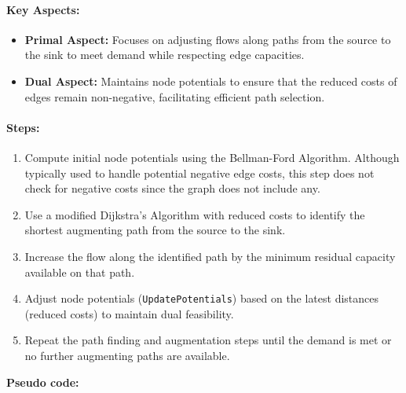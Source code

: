 \documentclass{article}
\begin{document}
\paragraph{Key Aspects:}
\begin{itemize}
    \item \textbf{Primal Aspect:} Focuses on adjusting flows along paths from the source to the sink to meet demand while respecting edge capacities.
    \item \textbf{Dual Aspect:} Maintains node potentials to ensure that the reduced costs of edges remain non-negative, facilitating efficient path selection.
\end{itemize}

\paragraph{Steps:}
\begin{enumerate}
    \item Compute initial node potentials using the Bellman-Ford Algorithm. Although typically used to handle potential negative edge costs, this step does not check for negative costs since the graph does not include any.
    \item Use a modified Dijkstra's Algorithm with reduced costs to identify the shortest augmenting path from the source to the sink.
    \item Increase the flow along the identified path by the minimum residual capacity available on that path.
    \item Adjust node potentials (\texttt{UpdatePotentials}) based on the latest distances (reduced costs) to maintain dual feasibility.
    \item Repeat the path finding and augmentation steps until the demand is met or no further augmenting paths are available.
\end{enumerate}

\textbf{Pseudo code:}
\end{document}
